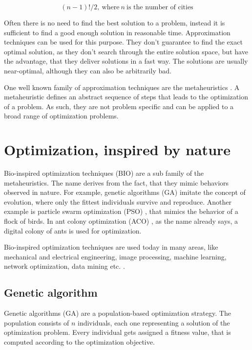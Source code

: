 \begin{equation}\label{eq:tsp-cities}
  (n - 1)! / 2, \ \mbox{where} \ n \ \mbox{is the number of cities}
\end{equation}

Often there is no need to find the best solution to a problem, instead it is sufficient to find a good enough solution in reasonable time. Approximation techniques can be used for this purpose. They don't guarantee to find the exact optimal solution, as they don't search through the entire solution space, but have the advantage, that they deliver solutions in a fast way. The solutions are usually near-optimal, although they can also be arbitrarily bad.

One well known family of approximation techniques are the metaheuristics \cite{yang2010nature}. A metaheuristic defines an abstract sequence of steps that leads to the optimization of a problem. As such, they are not problem specific and can be applied to a broad range of optimization problems.

\section{Optimization, inspired by nature}
Bio-inspired optimization techniques (BIO) are a sub family of the metaheuristics. The name derives from the fact, that they mimic behaviors observed in nature. For example, genetic algorithms (GA) \cite{sivanandam2008genetic} imitate the concept of evolution, where only the fittest individuals survive and reproduce. Another example is particle swarm optimization (PSO) \cite{kennedy2010particle}, that mimics the behavior of a flock of birds. In ant colony optimization (ACO) \cite{dorigo2010ant}, as the name already says, a digital colony of ants is used for optimization.

Bio-inspired optimization techniques are used today in many areas, like mechanical and electrical engineering, image processing, machine learning, network optimization, data mining etc. \cite{sivanandam2008genetic}.

\subsection{Genetic algorithm}
\label{chap:bioalgorithms:ga}
Genetic algorithms (GA) are a population-based optimization strategy. The population consists of $n$ individuals, each one representing a solution of the optimization problem. Every individual gets assigned a fitness value, that is computed according to the optimization objective.

